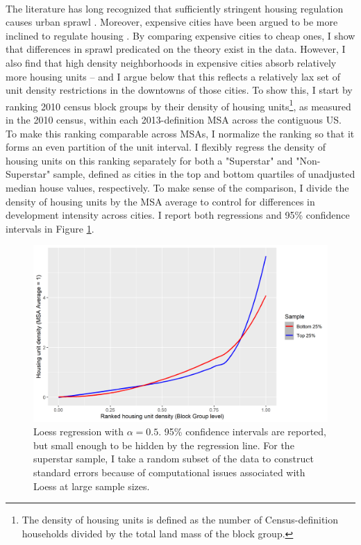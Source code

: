 \documentclass[]{article}
\begin{document}
\paragraph*{}
The literature has long recognized that sufficiently stringent housing regulation causes urban sprawl \citep{mills2005} \citep{bbheight}. Moreover, expensive cities have been argued to be more inclined to regulate housing \citep{HILBER2013} \citep{parkho}. By comparing expensive cities to cheap ones, I show that differences in sprawl predicated on the theory exist in the data. However, I also find that high density neighborhoods in expensive cities absorb relatively more housing units -- and I argue below that this reflects a relatively lax set of unit density restrictions in the downtowns of those cities. To show this, I start by ranking 2010 census block groups by their density of housing units\footnote{The density of housing units is defined as the number of Census-definition households divided by the total land mass of the block group.}, as measured in the 2010 census, within each 2013-definition MSA across the contiguous US. To make this ranking comparable across MSAs, I normalize the ranking so that it forms an even partition of the unit interval. I flexibly regress the density of housing units on this ranking separately for both a "Superstar" and "Non-Superstar" sample, defined as cities in the top and bottom quartiles of unadjusted median house values, respectively. To make sense of the comparison, I divide the density of housing units by the MSA average to control for differences in development intensity across cities. I report both regressions and 95\% confidence intervals in Figure \ref{Blockdens_dist}.
\begin{figure}[htbp]
\begin{center}
	\includegraphics[width=1.1\textwidth]{blockdens_dist.png}
	\caption{Loess regression with $\alpha = 0.5$. 95\% confidence intervals are reported, but small enough to be hidden by the regression line. For the superstar sample, I take a random subset of the data to construct standard errors because of computational issues associated with Loess at large sample sizes.}\label{Blockdens_dist}
\end{center}
\end{figure}
\end{document}
